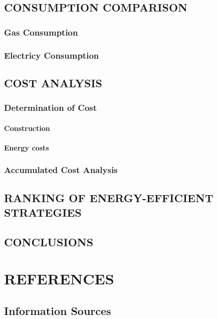 \documentclass[oneside , 12pt , a4paper]{book}
\begin{document}
\chapter{\large{CONSUMPTION COMPARISON}}
\section{Gas Consumption}
\section{Electricy Consumption}

\chapter{\large{COST ANALYSIS}}
\section{Determination of Cost}
\subsection{Construction}
\subsection{Energy costs}
\section*{Accumulated Cost Analysis}

\chapter{\large{RANKING OF ENERGY-EFFICIENT STRATEGIES}}

\chapter{\large{CONCLUSIONS}}

\part*{REFERENCES}
\chapter*{Information Sources}
\end{document}
